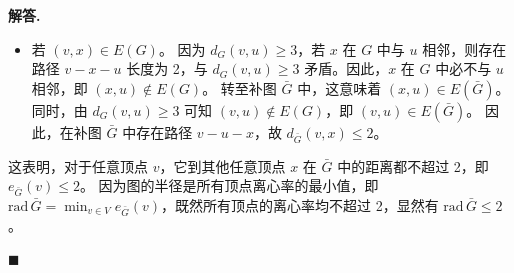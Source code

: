 \documentclass[12pt, a4paper, oneside]{ctexart}
\newenvironment{solution}{\par\noindent\textbf{解答. }}{\par}
\begin{document}
\begin{solution}
\begin{itemize}
    \item 若 $(v,x) \in E(G)$。
    因为 $d_G(v, u) \ge 3$，若 $x$ 在 $G$ 中与 $u$ 相邻，则存在路径 $v-x-u$ 长度为 2，与 $d_G(v, u) \ge 3$ 矛盾。因此，$x$ 在 $G$ 中必不与 $u$ 相邻，即 $(x,u) \notin E(G)$。
    转至补图 $\bar{G}$ 中，这意味着 $(x,u) \in E(\bar{G})$。同时，由 $d_G(v, u) \ge 3$ 可知 $(v,u) \notin E(G)$，即 $(v,u) \in E(\bar{G})$。
    因此，在补图 $\bar{G}$ 中存在路径 $v-u-x$，故 $d_{\bar{G}}(v, x) \le 2$。
\end{itemize}

这表明，对于任意顶点 $v$，它到其他任意顶点 $x$ 在 $\bar{G}$ 中的距离都不超过 2，即 $e_{\bar{G}}(v) \le 2$。
因为图的半径是所有顶点离心率的最小值，即 $\text{rad}\,\bar{G} = \min_{v \in V} e_{\bar{G}}(v)$，既然所有顶点的离心率均不超过 2，显然有 $\text{rad}\,\bar{G} \le 2$。

\hfill $\blacksquare$
\end{solution}
\end{document}
